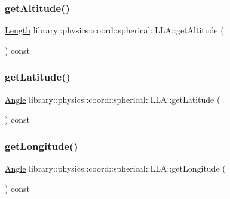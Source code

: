 \subsubsection{\texorpdfstring{get\+Altitude()}{getAltitude()}}
{\footnotesize\ttfamily \hyperlink{classlibrary_1_1physics_1_1units_1_1_length}{Length} library\+::physics\+::coord\+::spherical\+::\+L\+L\+A\+::get\+Altitude (\begin{DoxyParamCaption}{ }\end{DoxyParamCaption}) const}

\mbox{\label{classlibrary_1_1physics_1_1coord_1_1spherical_1_1_l_l_a_a4cae48d00f1f5319c1560f1bfe1b2cb5}} 
\subsubsection{\texorpdfstring{get\+Latitude()}{getLatitude()}}
{\footnotesize\ttfamily \hyperlink{classlibrary_1_1physics_1_1units_1_1_angle}{Angle} library\+::physics\+::coord\+::spherical\+::\+L\+L\+A\+::get\+Latitude (\begin{DoxyParamCaption}{ }\end{DoxyParamCaption}) const}

\mbox{\label{classlibrary_1_1physics_1_1coord_1_1spherical_1_1_l_l_a_a55ca45ade10658e903628afb5e35fc56}} 
\subsubsection{\texorpdfstring{get\+Longitude()}{getLongitude()}}
{\footnotesize\ttfamily \hyperlink{classlibrary_1_1physics_1_1units_1_1_angle}{Angle} library\+::physics\+::coord\+::spherical\+::\+L\+L\+A\+::get\+Longitude (\begin{DoxyParamCaption}{ }\end{DoxyParamCaption}) const}

